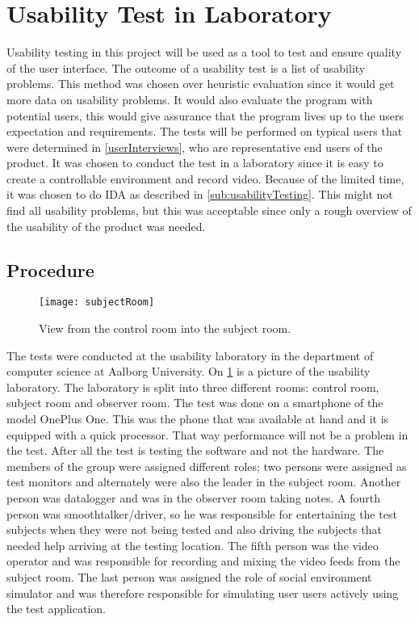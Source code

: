 \section{Usability Test in Laboratory}
Usability testing in this project will be used as a tool to test and
ensure quality of the user interface. The outcome of a usability
test is a list of usability problems. This method was chosen over heuristic evaluation since it would get more data on usability problems. It would also evaluate the program with potential users, this would give assurance that the program lives up to the users expectation and requirements. The tests will be performed on
typical users that were determined in \cref{userInterviews}, who are
representative end users of the product. It was chosen to conduct the
test in a laboratory since it is easy to create a controllable
environment and record video. Because of the limited time, it was
chosen to do IDA as described in \cref{sub:usabilityTesting}. This
might not find all usability problems, but this was acceptable since
only a rough overview of the usability of the product was needed.

\subsection{Procedure}
\begin{figure}
  \centering
  \texttt{[image: subjectRoom]}
  \caption{View from the control room into the subject room.}
  \label{fig:subjectRoom}
\end{figure}

The tests were conducted at the usability laboratory in the department of computer science at Aalborg University. On \cref{fig:subjectRoom} is a picture of the usability laboratory. The laboratory is split into three different rooms: control room, subject room and observer room. The test was done on a smartphone of the model OnePlus One. This was
the phone that was available at hand and it is equipped with a quick
processor. That way performance will not be a problem in the
test. After all the test is testing the software and not the
hardware. The members of the group were assigned different roles; two
persons were assigned as test monitors and alternately were also the
leader in the subject room. Another person was datalogger and was in
the observer room taking notes. A fourth person was
smoothtalker/driver, so he was responsible for entertaining the test
subjects when they were not being tested and also driving the subjects
that needed help arriving at the testing location. The fifth person
was the video operator and was responsible for recording and mixing
the video feeds from the subject room. The last person was assigned
the role of social environment simulator and was therefore responsible
for simulating user users actively using the test application.

